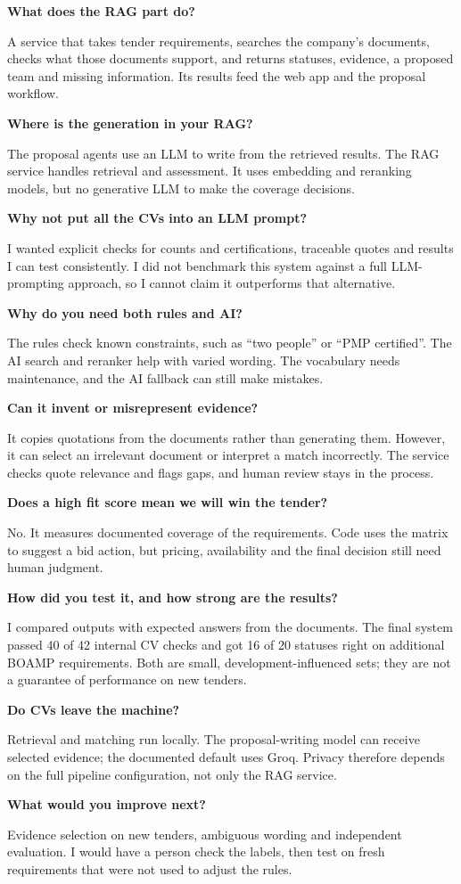 \documentclass[11pt,a4paper]{article}
\newcommand{\qa}[2]{\needspace{5\baselineskip}\textbf{\color{navy}#1}\par\nopagebreak
  #2\par\vspace{6pt}}
\begin{document}
\qa{What does the RAG part do?}{A service that takes tender requirements, searches the company's documents, checks what those documents support, and returns statuses, evidence, a proposed team and missing information. Its results feed the web app and the proposal workflow.}

\qa{Where is the generation in your RAG?}{The proposal agents use an LLM to write from the retrieved results. The RAG service handles retrieval and assessment. It uses embedding and reranking models, but no generative LLM to make the coverage decisions.}

\qa{Why not put all the CVs into an LLM prompt?}{I wanted explicit checks for counts and certifications, traceable quotes and results I can test consistently. I did not benchmark this system against a full LLM-prompting approach, so I cannot claim it outperforms that alternative.}

\qa{Why do you need both rules and AI?}{The rules check known constraints, such as ``two people'' or ``PMP certified''. The AI search and reranker help with varied wording. The vocabulary needs maintenance, and the AI fallback can still make mistakes.}

\qa{Can it invent or misrepresent evidence?}{It copies quotations from the documents rather than generating them. However, it can select an irrelevant document or interpret a match incorrectly. The service checks quote relevance and flags gaps, and human review stays in the process.}

\qa{Does a high fit score mean we will win the tender?}{No. It measures documented coverage of the requirements. Code uses the matrix to suggest a bid action, but pricing, availability and the final decision still need human judgment.}

\qa{How did you test it, and how strong are the results?}{I compared outputs with expected answers from the documents. The final system passed 40 of 42 internal CV checks and got 16 of 20 statuses right on additional BOAMP requirements. Both are small, development-influenced sets; they are not a guarantee of performance on new tenders.}

\qa{Do CVs leave the machine?}{Retrieval and matching run locally. The proposal-writing model can receive selected evidence; the documented default uses Groq. Privacy therefore depends on the full pipeline configuration, not only the RAG service.}

\qa{What would you improve next?}{Evidence selection on new tenders, ambiguous wording and independent evaluation. I would have a person check the labels, then test on fresh requirements that were not used to adjust the rules.}
\end{document}
